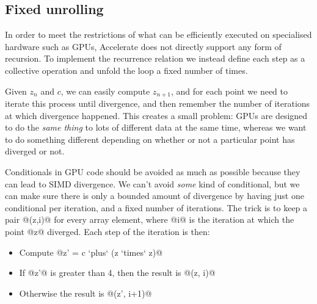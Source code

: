 \subsection{Fixed unrolling}

In order to meet the restrictions of what can be efficiently executed on
specialised hardware such as GPUs, Accelerate does not directly support any form
of recursion. To implement the recurrence relation we instead define each step
as a collective operation and unfold the loop a fixed number of times.

Given $z_{n}$ and $c$, we can easily compute $z_{n+1}$, and for each point we
need to iterate this process until divergence, and then remember the number of
iterations at which divergence happened. This creates a small problem: GPUs are
designed to do the \emph{same thing} to lots of different data at the same time,
whereas we want to do something different depending on whether or not a
particular point has diverged or not.

Conditionals in GPU code should be avoided as much as possible because they can
lead to SIMD divergence. We can't avoid \emph{some} kind of conditional, but we
can make sure there is only a bounded amount of divergence by having just one
conditional per iteration, and a fixed number of iterations. The trick is to
keep a pair @(z,i)@ for every array element, where @i@ is the
iteration at which the point @z@ diverged. Each step of the iteration is
then:
%
\begin{itemize}
    \item Compute @z' = c `plus` (z `times` z)@
    \item If @z'@ is greater than 4, then the result is @(z, i)@
    \item Otherwise the result is @(z', i+1)@
\end{itemize}

